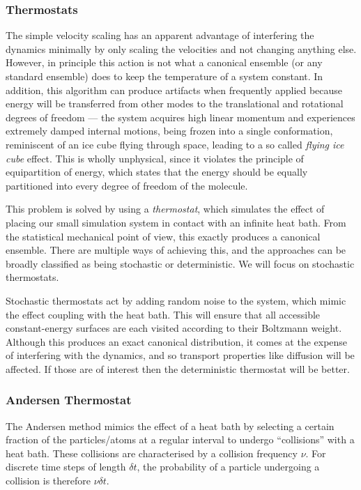 \documentclass{article}
\theoremstyle{plain}\theoremheaderfont{\normalfont\itshape}\theorembodyfont{\rmfamily}\theoremseparator{.}\newtheorem*{rem}{Remark}\newtheorem*{ex}{Example}\newtheorem*{proof}{Proof}\newtheorem*{altp}{Alternative proof}
\theoremstyle{plain}\theoremheaderfont{\normalfont\bfseries}\theorembodyfont{\rmfamily}\theoremseparator{.}\newtheorem{thm}{Theorem}[section]\newtheorem{lem}[thm]{Lemma}\newtheorem{prop}[thm]{Proposition}\newtheorem*{cor}{Corollary}\newtheorem{defn}[thm]{Definition}\newtheorem{clm}[thm]{Claim}\newtheorem{clminproof}{Claim}\newtheorem{alg}[thm]{Algorithm}\newtheorem{hyp}[thm]{Hypothesis}\newtheorem{law}[thm]{Law}
\theoremstyle{break}\theoremheaderfont{\normalfont\itshape}\theorembodyfont{\rmfamily}\theoremseparator{.\medskip}\newtheorem*{proofskip}{Proof}\newtheorem*{exs}{Examples}\newtheorem*{rems}{Remarks}
\theoremstyle{break}\theoremheaderfont{\normalfont\bfseries}\theorembodyfont{\rmfamily}\theoremseparator{.\medskip}\newtheorem{lemskip}[thm]{Lemma}\newtheorem{defnskip}[thm]{Definition}\newtheorem{propskip}[thm]{Proposition}\newtheorem{thmskip}[thm]{Theorem}
\numberwithin{equation}{section}
\begin{document}
    \subsubsection{Thermostats}
    The simple velocity scaling has an apparent advantage of interfering the dynamics minimally by only scaling the velocities and not changing anything else. However, in principle this action is not what a canonical ensemble (or any standard ensemble) does to keep the temperature of a system constant. In addition, this algorithm can produce artifacts when frequently applied because energy will be transferred from other modes to the translational and rotational degrees of freedom --- the system acquires high linear momentum and experiences extremely damped internal motions, being frozen into a single conformation, reminiscent of an ice cube flying through space, leading to a so called \textit{flying ice cube} effect. This is wholly unphysical, since it violates the principle of equipartition of energy, which states that the energy should be equally partitioned into every degree of freedom of the molecule.

    This problem is solved by using a \textit{thermostat}, which simulates the effect of placing our small simulation system in contact with an infinite heat bath. From the statistical mechanical point of view, this exactly produces a canonical ensemble. There are multiple ways of achieving this, and the approaches can be broadly classified as being stochastic or deterministic. We will focus on stochastic thermostats.

    Stochastic thermostats act by adding random noise to the system, which mimic the effect coupling with the heat bath. This will ensure that all accessible constant-energy surfaces are each visited according to their Boltzmann weight. Although this produces an exact canonical distribution, it comes at the expense of interfering with the dynamics, and so transport properties like diffusion will be affected. If those are of interest then the deterministic thermostat will be better.

    \subsubsection*{Andersen Thermostat}
    The Andersen method mimics the effect of a heat bath by selecting a certain fraction of the particles/atoms at a regular interval to undergo ``collisions'' with a heat bath. These collisions are characterised by a collision frequency \(\nu\). For discrete time steps of length \(\delta t\), the probability of a particle undergoing a collision is therefore \(\nu\delta t\).
\end{document}

